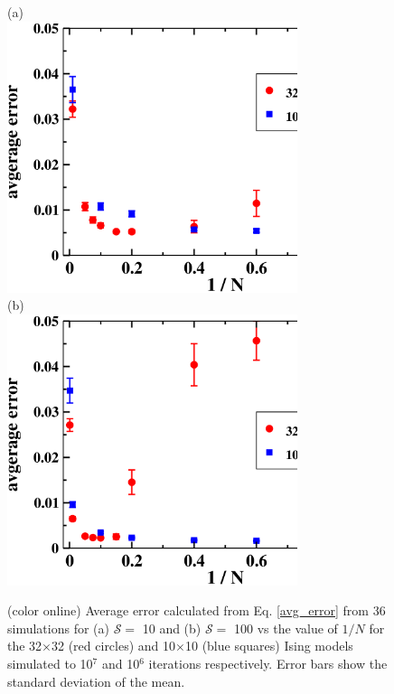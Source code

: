 \documentclass[aps,pre,reprint,superscriptaddress,showkeys]{revtex4-2}
\begin{document}
\begin{figure}[h!]
(a)\\
\vspace{1cm}
\includegraphics[width=8.5cm]{fig2a.eps}\\
\vspace{1cm}
(b)\\
\vspace{1cm}
\includegraphics[width=8.5cm]{fig2b.eps}\\

\caption{(color online) Average error calculated from Eq. \ref{avg_error} from 36 simulations for (a) $\mathcal{S}=$ 10 and (b) $\mathcal{S}=$ 100   vs the value of $1/N$ for the 32$\times$32 (red circles) and 10$\times$10 (blue squares) Ising models simulated to 10$^7$ and 10$^6$ iterations respectively.  Error bars show the standard deviation of the mean. \label{N_dependence}}
\end{figure}
\end{document}
